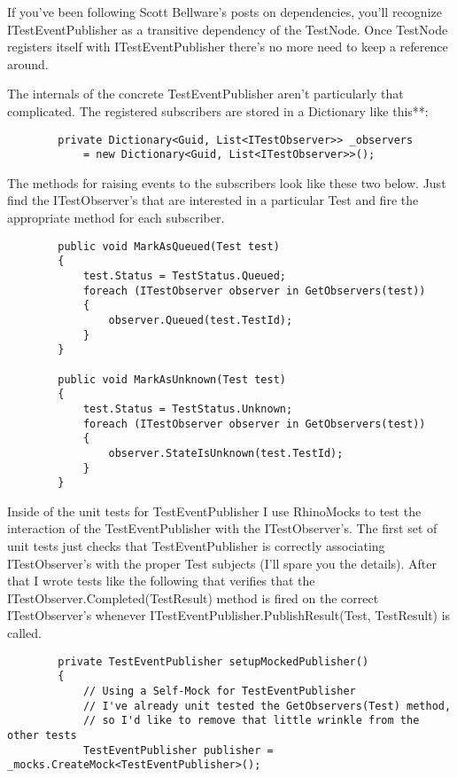 \documentclass{article}
\begin{document}
{If you've been following Scott Bellware's posts on dependencies, you'll recognize ITestEventPublisher as a transitive dependency of the TestNode.  Once TestNode registers itself with ITestEventPublisher there's no more need to keep a reference around.

The internals of the concrete TestEventPublisher aren't particularly that complicated.  The registered subscribers are stored in a Dictionary like this**:
\begin{lstlisting}
        private Dictionary<Guid, List<ITestObserver>> _observers
            = new Dictionary<Guid, List<ITestObserver>>();
\end{lstlisting}
 

The methods for raising events to the subscribers look like these two below.  Just find the ITestObserver's that are interested in a particular Test and fire the appropriate method for each subscriber.

 \begin{lstlisting}
        public void MarkAsQueued(Test test)
        {
            test.Status = TestStatus.Queued;
            foreach (ITestObserver observer in GetObservers(test))
            {
                observer.Queued(test.TestId);
            }
        } 

        public void MarkAsUnknown(Test test)
        {
            test.Status = TestStatus.Unknown;
            foreach (ITestObserver observer in GetObservers(test))
            {
                observer.StateIsUnknown(test.TestId);
            }
        }
\end{lstlisting}
 

Inside of the unit tests for TestEventPublisher I use RhinoMocks to test the interaction of the TestEventPublisher with the ITestObserver's.  The first set of unit tests just checks that TestEventPublisher is correctly associating ITestObserver's with the proper Test subjects (I'll spare you the details).  After that I wrote tests like the following that verifies that the ITestObserver.Completed(TestResult) method is fired on the correct ITestObserver's whenever ITestEventPublisher.PublishResult(Test, TestResult) is called.
\newpage
\begin{lstlisting}
        private TestEventPublisher setupMockedPublisher()
        {
            // Using a Self-Mock for TestEventPublisher
            // I've already unit tested the GetObservers(Test) method,
            // so I'd like to remove that little wrinkle from the other tests
            TestEventPublisher publisher = _mocks.CreateMock<TestEventPublisher>(); 


\end{lstlisting}}
\end{document}
